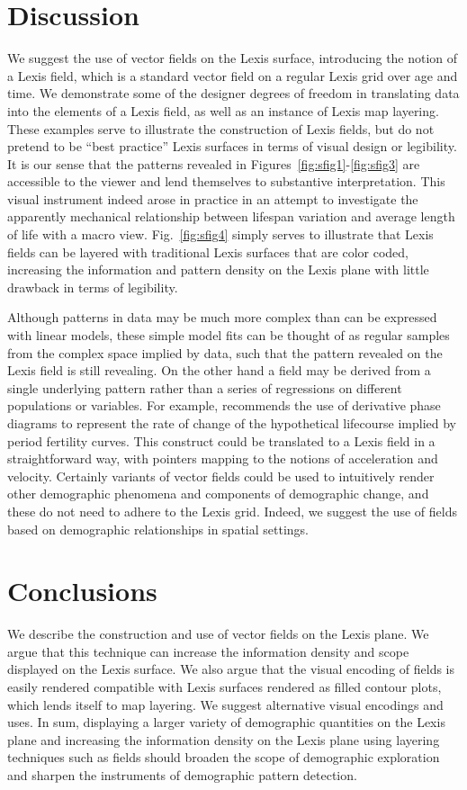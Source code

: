\documentclass{article}
\begin{document}
\section{Discussion}
We suggest the use of vector fields on the Lexis surface, introducing the notion of a Lexis field, which is a standard vector field on a regular Lexis grid over age and time. We demonstrate some of the designer degrees of freedom in translating data into the elements of a Lexis field, as well as an instance of Lexis map layering. These examples serve to illustrate the construction of Lexis fields, but do not pretend to be ``best practice'' Lexis surfaces in terms of visual design or legibility. It is our sense that the patterns revealed in Figures~\ref{fig:sfig1}-\ref{fig:sfig3} are accessible to the viewer and lend themselves to substantive interpretation. This visual instrument indeed arose in practice in an attempt to investigate the apparently mechanical relationship between lifespan variation and average length of life with a macro view. Fig.~\ref{fig:sfig4} simply serves to illustrate that Lexis fields can be layered with traditional Lexis surfaces that are color coded, increasing the information and pattern density on the Lexis plane with little drawback in terms of legibility. 

Although patterns in data may be much more complex than can be expressed with linear models, these simple model fits can be thought of as regular samples from the complex space implied by data, such that the pattern revealed on the Lexis field is still revealing. On the other hand a field may be derived from a single underlying pattern rather than a series of regressions on different populations or variables. For example, \citet{shang2018visualizing} recommends the use of derivative phase diagrams to represent the rate of change of the hypothetical lifecourse implied by period fertility curves. This construct could be translated to a Lexis field in a straightforward way, with pointers mapping to the notions of acceleration and velocity. Certainly variants of vector fields could be used to intuitively render other demographic phenomena and components of demographic change, and these do not need to adhere to the Lexis grid. Indeed, we suggest the use of fields based on demographic relationships in spatial settings.

\section{Conclusions}
We describe the construction and use of vector fields on the Lexis plane. We argue that this technique can increase the information density and scope displayed on the Lexis surface. We also argue that the visual encoding of fields is easily rendered compatible with Lexis surfaces rendered as filled contour plots, which lends itself to map layering. We suggest alternative visual encodings and uses. In sum, displaying a larger variety of demographic quantities on the Lexis plane and increasing the information density on the Lexis plane using layering techniques such as fields should broaden the scope of demographic exploration and sharpen the instruments of demographic pattern detection.
\end{document}
